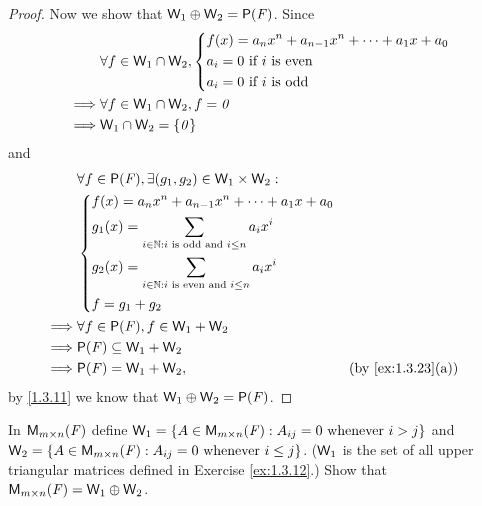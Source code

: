 \begin{proof}
  Now we show that \(\W_1 \oplus \W_2 = \ps{\F}\).
  Since
  \begin{align*}
             & \forall f \in \mathsf{W}_1 \cap \mathsf{W}_2, \begin{dcases}
      f(x) = a_n x^n + a_{n - 1} x^n + \cdots + a_1 x + a_0 \\
      a_i = 0 \text{ if } i \text{ is even}                 \\
      a_i = 0 \text{ if } i \text{ is odd}
    \end{dcases} \\
    \implies & \forall f \in \mathsf{W}_1 \cap \mathsf{W}_2, f = \mathit{0}                    \\
    \implies & \mathsf{W}_1 \cap \mathsf{W}_2 = \left\lbrace\mathit{0}\right\rbrace
  \end{align*}
  and
  \begin{align*}
             & \forall f \in \ps{\F}, \exists (g_1, g_2) \in \W_1 \times \W_2 :                                      \\
             & \begin{dcases}
      f(x) = a_n x^n + a_{n - 1} x^n + \cdots + a_1 x + a_0              \\
      g_1(x) = \sum_{i \in \N : i \text{ is odd and } i \leq n} a_i x^i  \\
      g_2(x) = \sum_{i \in \N : i \text{ is even and } i \leq n} a_i x^i \\
      f = g_1 + g_2
    \end{dcases}                                                                            \\
    \implies & \forall f \in \ps{\F}, f \in \W_1 + \W_2                                                              \\
    \implies & \ps{\F} \subseteq \W_1 + \W_2                                                                         \\
    \implies & \ps{\F} = \W_1 + \W_2,                                           &  & \text{(by \cref{ex:1.3.23}(a))}
  \end{align*}
  by \cref{1.3.11} we know that \(\W_1 \oplus \W_2 = \ps{\F}\).
\end{proof}

\begin{ex}\label{ex:1.3.26}
  In \(\mathsf{M}_{{m} \times n}({\mathit{F}})\) define \(\mathsf{W}_1 = \left\lbrace A \in \mathsf{M}_{{m} \times n}({\mathit{F}}) : A_{i j} = 0 \text{ whenever } i > j\right\rbrace\) and \(\mathsf{W}_2 = \left\lbrace A \in \mathsf{M}_{{m} \times n}({\mathit{F}}) : A_{i j} = 0 \text{ whenever } i \leq j\right\rbrace\).
  (\(\mathsf{W}_1\) is the set of all upper triangular matrices defined in Exercise \cref{ex:1.3.12}.)
  Show that \(\mathsf{M}_{{m} \times n}({\mathit{F}}) = \mathsf{W}_1 \oplus \mathsf{W}_2\).
\end{ex}

